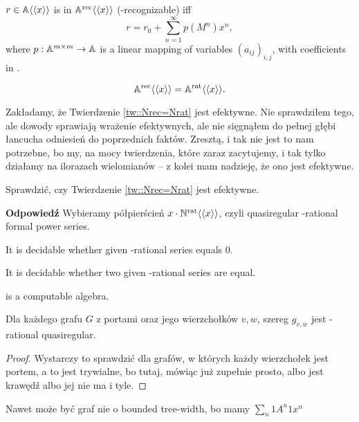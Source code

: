 \begin{df}
\begin{df}
	$r \in  \mathbb{ A } \langle\langle x \rangle\rangle $ is in $ \mathbb{ A }^{\text{rec}} \langle\langle x \rangle\rangle $ (\bbA-recognizable) iff
	$$
		r = r_0 + \sum_{n=1}^{\infty} p(M^n) x^n,
	$$
	 where $p:\mathbb{A} ^{m \times m} \rightarrow \mathbb{A}$ is a linear mapping of variables $(a_{ij})_{i,j}$, with coefficients in \A.
\end{df}
\begin{tw}\label{tw::Nrec=Nrat}
	  $$
	  	 \mathbb{ A }^{\text{rec}} \langle\langle x \rangle\rangle  =  \mathbb{ A }^{\text{rat}} \langle\langle x \rangle\rangle .
	  $$
\end{tw}
\begin{uw}
		Zakładamy, że Twierdzenie \ref{tw::Nrec=Nrat} jest efektywne. Nie sprawdziłem tego, ale dowody sprawiają wrażenie efektywnych, ale nie sięgnąłem do pełnej głębi łancucha odniesień do poprzednich faktów. Zresztą, i tak nie jest to nam potrzebne, bo my, na mocy twierdzenia, które zaraz zacytujemy, i tak tylko działamy na ilorazach wielomianów -- z kolei mam nadzieję, że ono jest efektywne.
\end{uw}
\begin{dozr}
	Sprawdzić, czy Twierdzenie \ref{tw::Nrec=Nrat} jest efektywne.
\end{dozr}
\textbf{Odpowiedź} Wybieramy półpierścień $x\cdot  \mathbb{ N }^{\text{rat}} \langle\langle x \rangle\rangle $, czyli quasiregular \bbN-rational formal power series.
\begin{tw}
	It is decidable whether given \Z-rational series equals 0.
\end{tw}
\begin{wn}
	It is decidable whether two given \N-rational series are equal.
\end{wn}
\begin{wn}
	\Nratqralg is a computable algebra.
\end{wn}




\begin{lm}
Dla każdego grafu $G$ z portami oraz jego wierzchołków $v, w$, szereg $g_{v, w}$ jest \N-rational quasiregular.
	\end{lm}
\begin{proof}
Wystarczy to sprawdzić dla grafów, w których każdy wierzchołek jest portem, a to jest trywialne, bo tutaj, mówiąc już zupełnie prosto, albo jest krawędź albo jej nie ma i tyle.
\end{proof}
\begin{uw}
	Nawet może być graf nie o bounded tree-width, bo mamy $\sum_n 1A^n1 x^n$
\end{uw}

\end{df}
